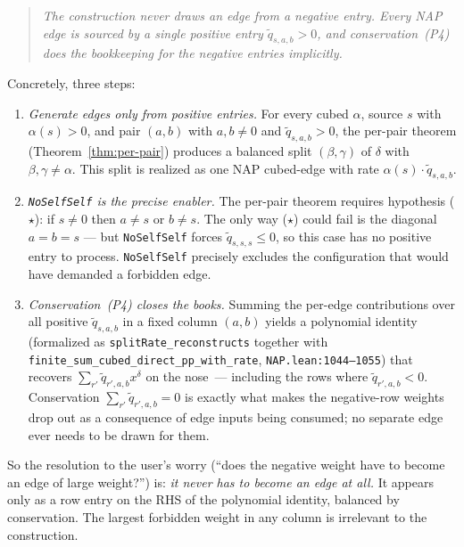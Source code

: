 \documentclass[11pt]{article}
\newcommand{\slack}{0}
\begin{document}
\begin{quote}
\emph{The construction never draws an edge from a negative entry.
Every NAP edge is sourced by a single positive entry $\widetilde q_{s,a,b} > 0$,
and conservation~(P4) does the bookkeeping for the negative entries
implicitly.}
\end{quote}

Concretely, three steps:

\begin{enumerate}
  \item \emph{Generate edges only from positive entries.} For every cubed
    $\alpha$, source $s$ with $\alpha(s) > 0$, and pair $(a, b)$ with
    $a, b \ne \slack$ and $\widetilde q_{s, a, b} > 0$, the per-pair
    theorem (Theorem~\ref{thm:per-pair}) produces a balanced split
    $(\beta, \gamma)$ of $\delta$ with $\beta, \gamma \ne \alpha$. This
    split is realized as one NAP cubed-edge with rate
    $\alpha(s) \cdot \widetilde q_{s, a, b}$.

  \item \emph{\texttt{NoSelfSelf} is the precise enabler.} The per-pair
    theorem requires hypothesis ($\star$): if $s \ne \slack$ then
    $a \ne s$ or $b \ne s$. The only way ($\star$) could fail is the
    diagonal $a = b = s$ — but \verb|NoSelfSelf| forces
    $\widetilde q_{s, s, s} \le 0$, so this case has no positive entry to
    process. \verb|NoSelfSelf| precisely excludes the configuration that
    would have demanded a forbidden edge.

  \item \emph{Conservation~(P4) closes the books.} Summing the per-edge
    contributions over all positive $\widetilde q_{s, a, b}$ in a fixed
    column $(a, b)$ yields a polynomial identity (formalized as
    \texttt{splitRate\_reconstructs} together with
    \texttt{finite\_sum\_cubed\_direct\_pp\_with\_rate},
    \texttt{NAP.lean:1044--1055}) that recovers
    $\sum_{r'} \widetilde q_{r', a, b} x^\delta$ on the
    nose~--- including the rows where $\widetilde q_{r', a, b} < 0$.
    Conservation $\sum_{r'} \widetilde q_{r', a, b} = 0$ is exactly what
    makes the negative-row weights drop out as a consequence of edge
    inputs being consumed; no separate edge ever needs to be drawn for
    them.
\end{enumerate}

So the resolution to the user's worry (``does the negative weight have to
become an edge of large weight?'') is: \emph{it never has to become an
edge at all.} It appears only as a row entry on the RHS of the
polynomial identity, balanced by conservation. The largest forbidden
weight in any column is irrelevant to the construction.
\end{document}
